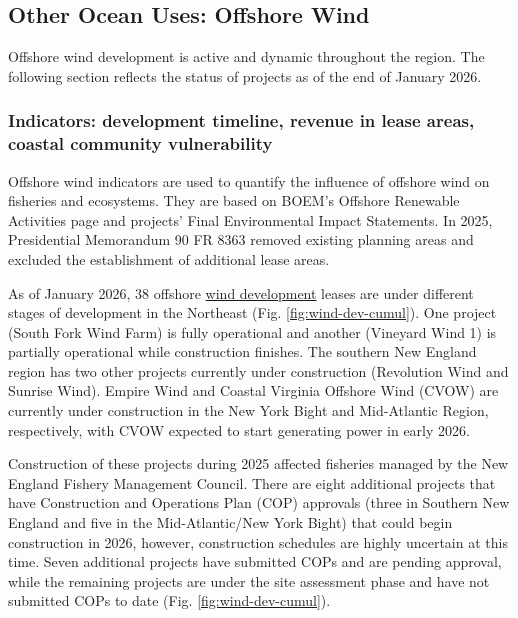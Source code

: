 \documentclass[
  10pt,
]{article}
\begin{document}
\subsection{Other Ocean Uses: Offshore Wind}\label{other-ocean-uses-offshore-wind}

Offshore wind development is active and dynamic throughout the region. The following section reflects the status of projects as of the end of January 2026.

\subsubsection{Indicators: development timeline, revenue in lease areas, coastal community vulnerability}\label{indicators-development-timeline-revenue-in-lease-areas-coastal-community-vulnerability}

Offshore wind indicators are used to quantify the influence of offshore wind on fisheries and ecosystems. They are based on BOEM's Offshore Renewable Activities page and projects' Final Environmental Impact Statements. In 2025, Presidential Memorandum 90 FR 8363 removed existing planning areas and excluded the establishment of additional lease areas.

As of January 2026, 38 offshore \href{https://noaa-edab.github.io/catalog/wind_dev_speed.html}{wind development} leases are under different stages of development in the Northeast (Fig. \ref{fig:wind-dev-cumul}). One project (South Fork Wind Farm) is fully operational and another (Vineyard Wind 1) is partially operational while construction finishes. The southern New England region has two other projects currently under construction (Revolution Wind and Sunrise Wind). Empire Wind and Coastal Virginia Offshore Wind (CVOW) are currently under construction in the New York Bight and Mid-Atlantic Region, respectively, with CVOW expected to start generating power in early 2026.

Construction of these projects during 2025 affected fisheries managed by the New England Fishery Management Council. There are eight additional projects that have Construction and Operations Plan (COP) approvals (three in Southern New England and five in the Mid-Atlantic/New York Bight) that could begin construction in 2026, however, construction schedules are highly uncertain at this time. Seven additional projects have submitted COPs and are pending approval, while the remaining projects are under the site assessment phase and have not submitted COPs to date (Fig. \ref{fig:wind-dev-cumul}).
\end{document}
